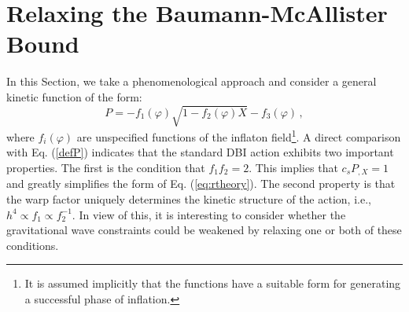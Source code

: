 \section{Relaxing the Baumann-McAllister Bound}
% 
\label{sec:relaxing-dbi}
% 
In this Section, we take a phenomenological 
approach and consider a general kinetic function of the form:
% 
\begin{equation}
\label{eq:genaction-dbi}
P= -f_1 (\varphi ) \sqrt{1-f_2 (\varphi ) X} -f_3 (\varphi) \,,
\end{equation}
% 
where $f_i (\varphi )$ are unspecified functions of the inflaton 
field\footnote{It is assumed 
implicitly that the functions have a suitable form for 
generating a successful phase of inflation.}.
A direct comparison with Eq. (\ref{defP}) 
indicates that the standard DBI action exhibits two important properties. 
The first is the condition that $f_1 f_2 =2$. This implies that 
$c_sP_{,X} =1$ and greatly simplifies the form of Eq. (\ref{eq:rtheory}). 
The second property is that the warp factor uniquely determines 
the kinetic structure of the action, i.e., $h^4 \propto f_1 \propto f_2^{-1}$.  
In view of this, it is interesting to consider whether
the gravitational wave constraints could be weakened by relaxing one 
or both of these conditions. 


